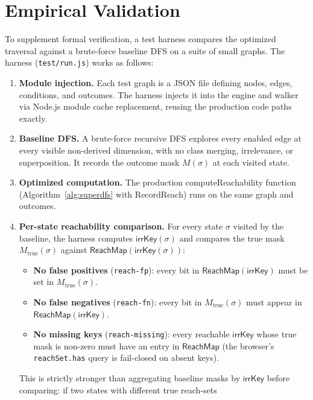 \documentclass[11pt]{article}
\theoremstyle{definition}
\newcommand{\sel}{\sigma}              %
\newcommand{\ik}{\mathsf{irrKey}}      %
\begin{document}
\section{Empirical Validation}\label{sec:empirical}

To supplement formal verification, a test harness compares the optimized
traversal against a brute-force baseline DFS on a suite of small graphs.
The harness (\texttt{test/run.js}) works as follows:

\begin{enumerate}
  \item \textbf{Module injection.} Each test graph is a JSON file
    defining nodes, edges, conditions, and outcomes. The harness injects
    it into the engine and walker via Node.js module cache replacement,
    reusing the production code paths exactly.
  \item \textbf{Baseline DFS.} A brute-force recursive DFS explores every
    enabled edge at every visible non-derived dimension, with no class
    merging, irrelevance, or superposition. It records the outcome mask
    $M(\sel)$ at each visited state.
  \item \textbf{Optimized computation.} The production
    \textsf{computeReachability} function (Algorithm~\ref{alg:superdfs}
    with \textsf{RecordReach}) runs on the same graph and outcomes.
  \item \textbf{Per-state reachability comparison.} For every state
    $\sel$ visited by the baseline, the harness computes $\ik(\sel)$ and
    compares the true mask $M_\text{true}(\sel)$ against
    $\mathsf{ReachMap}(\ik(\sel))$:
    \begin{itemize}
      \item \textbf{No false positives} (\texttt{reach-fp}): every bit
        in $\mathsf{ReachMap}(\ik)$ must be set in
        $M_\text{true}(\sel)$.
      \item \textbf{No false negatives} (\texttt{reach-fn}): every bit
        in $M_\text{true}(\sel)$ must appear in
        $\mathsf{ReachMap}(\ik)$.
      \item \textbf{No missing keys} (\texttt{reach-missing}):
        every reachable $\ik$ whose true mask is non-zero must have an
        entry in $\mathsf{ReachMap}$ (the browser's
        \texttt{reachSet.has} query is fail-closed on absent keys).
    \end{itemize}
    This is strictly stronger than aggregating baseline masks by $\ik$
    before comparing: if two states with different true reach-sets

\end{enumerate}
\end{document}
